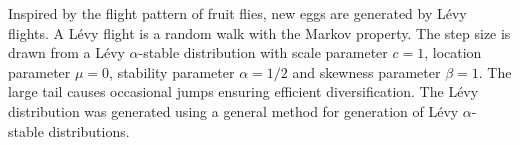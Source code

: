\documentclass[a4paper, 5p, sort&compress]{elsarticle}%
\begin{document}
Inspired by the flight pattern of fruit flies\cite{Reynolds}, new eggs
are generated by Lévy flights. A Lévy flight is a random walk with the
Markov property. The step size is drawn from a Lévy
$\alpha$-stable distribution%
with scale parameter $c = 1$, location parameter $\mu = 0$, stability
parameter $\alpha = 1/2$ and skewness parameter $\beta = 1$. The large tail
causes occasional jumps ensuring efficient diversification. The Lévy
distribution was generated using a general method for generation of
Lévy $\alpha$-stable distributions\cite{Weron1994}.






\end{document}
